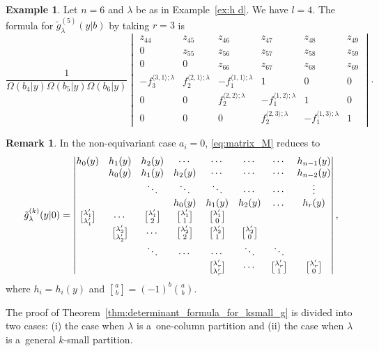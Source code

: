 \documentclass[pdftex]{sigma}
\numberwithin{equation}{section}
\newcommand{\la}{\lambda}
\theoremstyle{definition}
\newtheorem{Example}[Theorem]{Example}
\newtheorem{Remark}[Theorem]{Remark}
\begin{document}
\begin{Example}\label{ex:k small det}
Let $n=6$ and $\la$ be as in Example~\ref{ex:h d}. We have $l=4$.
The formula for $\tilde{g}^{(5)}_{\lambda}(y|b)$ by taking $r=3$ is
\[
\frac{1}{\Omega(b_4|y)\Omega(b_5|y)\Omega(b_6|y)}
\begin{vmatrix}
 z_{44}&z_{45}&z_{46}&z_{47}&z_{48}&z_{49}\\
 0&z_{55}&z_{56}&z_{57}&z_{58}&z_{59}\\
 0&0&z_{66}&z_{67}&z_{68}&z_{69}\\
 -f_3^{\langle 3,1\rangle;\la} & f_2^{\langle 2,1\rangle;\la} & -f_1^{\langle 1,1 \rangle;\la} & 1 & 0 & 0\\
 0&0&f_2^{\langle 2,2\rangle;\la}&-f_1^{\langle 1,2 \rangle;\la} & 1 &0\\
 0&0&0&f_2^{\langle 2,3\rangle;\la}&-f_1^{\langle 1,3 \rangle;\la} & 1
\end{vmatrix}.
\]
\end{Example}

\begin{Remark}
\bgroup
\renewcommand\binom[2]{\genfrac{[}{]}{0pt}{1}{#1}{#2}}
In the non-equivariant case $a_i=0$, \eqref{eq:matrix_M} reduces to
\[
\Tilde{g}^{(k)}_\lambda(y|0)=%
\begin{vmatrix}
h_0(y)&h_1(y)&h_2(y)&\cdots&\cdots&\cdots &\cdots &h_{n-1}(y)\\
&h_0(y)&h_1(y)&h_2(y)&\cdots&\cdots &\cdots &h_{n-2}(y)\\
&&\ddots&\ddots&\ddots&\cdots &\cdots &\vdots\\
&&&h_0(y)&h_1(y)&h_2(y)&\dots &h_r(y)\\
\binom{\lambda_1'}{\lambda_1'}&\cdots&\binom{\lambda_1'}{2}&\binom{\lambda_1'}{1}&\binom{\lambda_1'}{0}\\
&\binom{\lambda_2'}{\lambda_2'}&\cdots&\binom{\lambda_2'}{2}&\binom{\lambda'_2}{1}&\binom{\lambda_2'}{0}\\
&&\ddots&\cdots&\cdots&\ddots&\ddots\\
&&&&\binom{\lambda_r'}{\lambda_r'}&\cdots&\binom{\lambda_r'}{1}&\binom{\lambda_r'}{0}
\end{vmatrix},
\]
where $h_i=h_i(y)$ and $\binom{a}{b}=(-1)^b\genfrac{(}{)}{0pt}{1}{a}{b}$.
\egroup
\end{Remark}

The proof of Theorem~\ref{thm:determinant_formula_for_ksmall_g} is divided into two cases: (i) the case when $\lambda$ is a~one-column partition and (ii) the case when $\lambda$ is a~general $k$-small partition.
\end{document}
